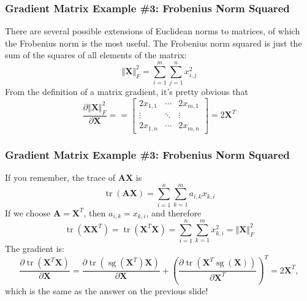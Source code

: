 \documentclass{beamer}
\DeclareMathOperator{\tr}{tr}
\DeclareMathOperator*{\sg}{sg}
\begin{document}
\begin{frame}
  \frametitle{Gradient Matrix Example \#3: Frobenius Norm Squared}

  There are several possible extensions of Euclidean norms to
  matrices, of which the Frobenius norm is the most useful.  The
  Frobenius norm squared is just the sum of the squares of all
  elements of the matrix:
  \begin{displaymath}
    \Vert\mathbf{X}\Vert_F^2
    =\sum_{i=1}^m\sum_{j=1}^n x_{i,j}^2
  \end{displaymath}
  From the definition of a matrix gradient, it's pretty obvious that
    \begin{displaymath}
      \frac{\partial\Vert\mathbf{X}\Vert_F^2}{\partial\mathbf{X}}=
      =\left[\begin{array}{ccc}
          2x_{1,1}&\cdots&2x_{m,1}\\
          \vdots&\ddots&\vdots\\
          2x_{1,n}&\cdots&2x_{m,n}
      \end{array}\right]=2\mathbf{X}^T
    \end{displaymath}
\end{frame}

\begin{frame}
  \frametitle{Gradient Matrix Example \#3: Frobenius Norm Squared}
    If you remember, the trace of $\mathbf{A}\mathbf{X}$ is
  \begin{displaymath}
    \tr(\mathbf{A}\mathbf{X})= \sum_{i=1}^n\sum_{k=1}^m a_{i,k}x_{k,i}
  \end{displaymath}
  If we choose $\mathbf{A}=\mathbf{X}^T$, then $a_{i,k}=x_{k,i}$, and
  therefore
  \begin{displaymath}
    \tr(\mathbf{X}\mathbf{X}^T)=
    \tr(\mathbf{X}^T\mathbf{X})=
    \sum_{i=1}^n\sum_{k=1}^m x_{k,i}^2 =\Vert\mathbf{X}\Vert_F^2
  \end{displaymath}
  The gradient is:
  \begin{displaymath}
    \frac{\partial\tr(\mathbf{X}^T\mathbf{X})}{\partial\mathbf{X}}=
    \frac{\partial\tr(\sg(\mathbf{X}^T)\mathbf{X})}{\partial\mathbf{X}}+
    \left(\frac{\partial\tr(\mathbf{X}^T\sg(\mathbf{X}))}{\partial\mathbf{X}^T}\right)^T=
    2\mathbf{X}^T,
  \end{displaymath}
  which is the same as the answer on the previous slide!
\end{frame}
\end{document}
